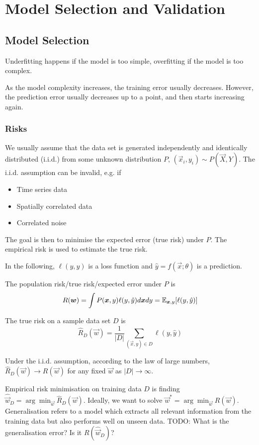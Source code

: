 \chapter{Model Selection and Validation}

\section{Model Selection}
Underfitting happens if the model is too
simple, overfitting if the model is too complex.

As the model complexity increases,
the training error usually decreases.
However, the prediction error usually
decreases up to a point, and then starts
increasing again.


\subsection{Risks}
We usually assume that the data set is generated
independently and identically distributed (i.i.d.)
from some unknown distribution $P$,
$(\vec{x}_i, y_i) \sim P(\vec{X}, Y)$.
The i.i.d. assumption can be invalid, e.g. if
\begin{itemize}
	\item Time series data
	\item Spatially correlated data
	\item Correlated noise
\end{itemize}
The goal is then to minimise the expected error
(true risk) under $P$.
The empirical risk is used to estimate the true risk.

In the following, $\ell(y, \hat{y})$ is a loss function
and $\hat{y} = f(\vec{x}; \theta)$ is a prediction.

The population risk/true risk/expected error under $P$ is
\begin{equation*}
R(\boldsymbol{w})
= \int{P(\boldsymbol{x}, y)\ell(y, \hat{y}) d\boldsymbol{x} dy}
= \mathbb{E}_{\boldsymbol{x}, y}[\ell(y, \hat{y})]
\end{equation*}

The true risk on a sample data set $D$ is
\begin{equation*}
\hat{R}_D(\vec{w}) = \frac{1}{|D|}
\sum_{(\vec{x}, y) \in D}{\ell(y, \hat{y})}
\end{equation*}

Under the i.i.d. assumption,
according to the law of large numbers,
$\hat{R}_D(\vec{w}) \to R(\vec{w})$
for any fixed $\vec{w}$ as $|D| \to \infty$.

Empirical risk minimisation on training data $D$ is
finding
$\hat{\vec{w}}_D = \arg\min_{\vec{w}}{\hat{R}_D(\vec{w})}$.
Ideally, we want to solve
$\vec{w}^* = \arg\min_{\vec{w}}{R(\vec{w})}$.
Generalisation refers to a model which extracts
all relevant information from the training data
but also performs well on unseen data.
TODO: What is the generalisation error? Is it $R(\hat{\vec{w}}_D)$?

